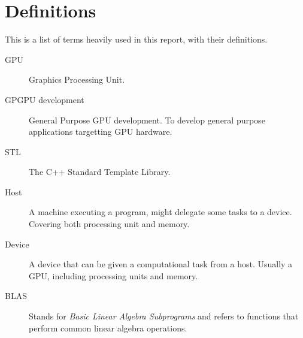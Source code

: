 \section*{Definitions}
This is a list of terms heavily used in this report, with their definitions.

\begin{description}
\item[GPU] Graphics Processing Unit.
\item[GPGPU development] General Purpose GPU development. To develop general purpose applications targetting GPU hardware.
\item[STL] The C++ Standard Template Library.
\item[Host] A machine executing a program, might delegate some tasks to a device. Covering both processing unit and memory.
\item[Device] A device that can be given a computational task from a host. Usually a GPU, including processing units and memory.
\item[BLAS] Stands for \textit{Basic Linear Algebra Subprograms} and refers to functions that perform common linear algebra operations.
\end{description}
